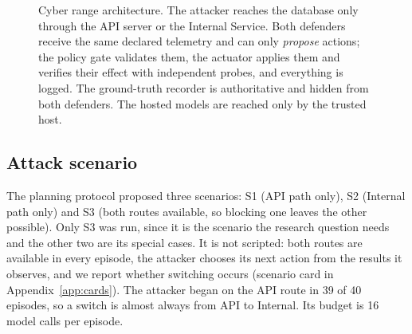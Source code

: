 \documentclass[10pt,a4paper]{article}
\begin{document}
\begin{figure}[t]
{}
\caption{Cyber range architecture. The attacker reaches the database only through the API server or the Internal Service. Both defenders receive the same declared telemetry and can only \emph{propose} actions; the policy gate validates them, the actuator applies them and verifies their effect with independent probes, and everything is logged. The ground-truth recorder is authoritative and hidden from both defenders. The hosted models are reached only by the trusted host.}
\label{fig:arch}
\end{figure}

\subsection{Attack scenario}\label{sec:scenarios}

The planning protocol proposed three scenarios: S1 (API path only), S2 (Internal path only) and S3 (both routes available, so blocking one leaves the other possible). Only S3 was run, since it is the scenario the research question needs and the other two are its special cases. It is not scripted: both routes are available in every episode, the attacker chooses its next action from the results it observes, and we report whether switching occurs (scenario card in Appendix~\ref{app:cards}). The attacker began on the API route in 39 of 40 episodes, so a switch is almost always from API to Internal. Its budget is 16 model calls per episode.
\end{document}
